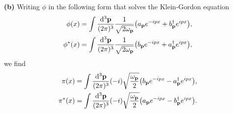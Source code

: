 \documentclass{article}
\makeatletter
\newcommand*{\shifttext}[1]{%
  \settowidth{\@tempdima}{#1}%
  \hspace{-\@tempdima}#1%
}
\newcommand{\plabel}[1]{%
\shifttext{\textbf{#1}\quad}%
}
\makeatother
\begin{document}
\plabel{(b)}%
\newcommand{\removethis}[1]{}%
\removethis{Writing
\[ \phi_1 = \frac{\phi + \phi^*}{2},\quad \phi_2 = \frac{\phi - \phi^*}{2i}, \]
we find their momenta
\[ \pi_1 = \pi + \pi^*,\quad \pi_2 = i(\pi - \pi^*), \]
and the commutators
\begin{align*}
    [\phi_i(\vb{x}), \pi_j(\vb{y})] &= i \delta_{ij}\delta^{(3)}(\vb{x} - \vb{y}), \\
    [\phi_i(\vb{x}), \phi_j(\vb{y})] &= [\pi_i(\vb{x}), \pi_j(\vb{y})] = 0.
\end{align*}
The Hamiltonian may be rewritten as
\[ H = \int \dd{^3 x} \qty(\frac{\pi_1^2}{4} + \frac{\pi_2^2}{4} + \abs{\grad \phi_1}^2 + \abs{\grad \phi_2}^2 + m^2(\phi_1^2 + \phi_2^2)), \]
which may be decoupled as two independent Hamiltonians
\[ H = H_1 + H_2 \]
where
\[ H_i = \int \dd{^3 x} \qty(\frac{\pi_i^2}{4} + \abs{\grad \phi_i}^2 + m^2\phi_i^2). \]
With
\begin{align*}
    \phi_i(\vb{x}) &= \int \frac{\dd{^3\vb{p}}}{(2\pi)^3} \frac{1}{\sqrt{2\omega_{\vb{p}}}} \qty(a_{i,\vb{p}} e^{i\vb{p}\cdot \vb{x}} + a^\dagger_{i,\vb{p}} e^{-i\vb{p}\cdot \vb{x}}), \\
    \pi(\vb{x}) &= \int \frac{\dd{^3\vb{p}}}{(2\pi)^3} (-i) \sqrt{\frac{\omega_{\vb{p}}}{2}} \qty(a_{i,\vb{p}} e^{i\vb{p}\cdot \vb{x}} - a^\dagger_{i,\vb{p}} e^{-i\vb{p}\cdot \vb{x}}),
\end{align*}}%
Writing $\phi$ in the following form that solves the Klein-Gordon equation
\begin{align*}
    \phi(x) &= \int \frac{\dd{^3 \vb{p}}}{(2\pi)^3} \frac{1}{\sqrt{2\omega_{\vb{p}}}}\qty(a_{\vb{p}} e^{-ipx} + b^\dagger_{\vb{p}} e^{ipx}), \\
    \phi^*(x) &= \int \frac{\dd{^3 \vb{p}}}{(2\pi)^3} \frac{1}{\sqrt{2\omega_{\vb{p}}}}\qty(b_{\vb{p}} e^{-ipx} + a^\dagger_{\vb{p}} e^{ipx}),
\end{align*}
we find
\begin{align*}
    \pi(x) &= \int \frac{\dd{^3 \vb{p}}}{(2\pi)^3} (-i) \sqrt{\frac{\omega_{\vb{p}}}{2}} \qty(b_{\vb{p}} e^{-ipx} - a^\dagger_{\vb{p}} e^{ipx}), \\
    \pi^*(x) &= \int \frac{\dd{^3 \vb{p}}}{(2\pi)^3} (-i) \sqrt{\frac{\omega_{\vb{p}}}{2}} \qty(a_{\vb{p}} e^{-ipx} - b^\dagger_{\vb{p}} e^{ipx}).
\end{align*}
\end{document}

